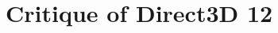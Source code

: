 \section{Critique of Direct3D 12}\label{sec:citique_of_direct3d_12}
\begin{sectionmeta}
\end{sectionmeta}